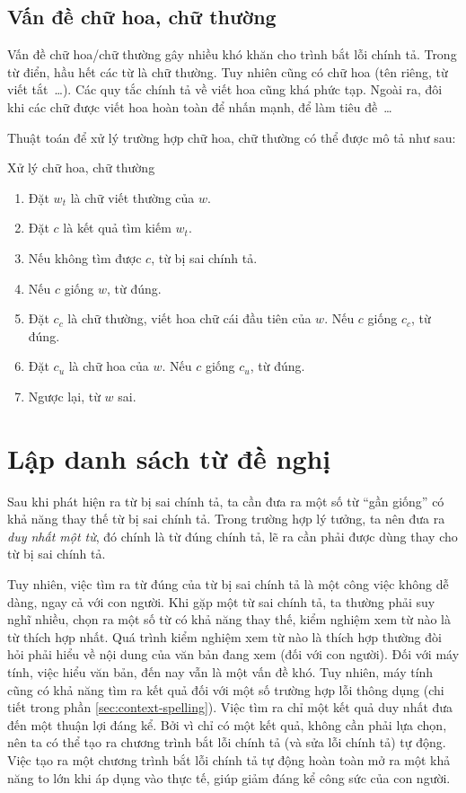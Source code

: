 \documentclass[a4paper,oneside,14pt]{extbook} %
\begin{document}
\subsection{Vấn đề chữ hoa, chữ thường}

Vấn đề chữ hoa/chữ thường gây nhiều khó khăn cho trình bắt lỗi chính
tả. Trong từ điển, hầu hết các từ là chữ thường. Tuy nhiên cũng có chữ
hoa (tên riêng, từ viết tắt~\ldots{}). Các quy tắc chính tả về viết hoa
cũng khá phức tạp. Ngoài ra, đôi khi các chữ được viết hoa hoàn toàn
để nhấn mạnh, để làm tiêu đề~\ldots{}

Thuật toán để xử lý trường hợp chữ hoa, chữ thường có thể được mô tả
như sau:
\begin{algo}\caption{Xử lý chữ hoa, chữ thường}
\begin{enumerate}
\item Đặt $w_t$ là chữ viết thường của $w$.
\item Đặt $c$ là kết quả tìm kiếm $w_t$.
\item Nếu không tìm được $c$, từ bị sai chính tả.
\item Nếu $c$ giống $w$, từ đúng.
\item Đặt $c_c$ là chữ thường, viết hoa chữ cái đầu tiên của $w$. Nếu
  $c$ giống $c_c$, từ đúng.
\item Đặt $c_u$ là chữ hoa của $w$. Nếu $c$ giống $c_u$, từ đúng.
\item Ngược lại, từ $w$ sai.
\end{enumerate}
\end{algo}



\section{Lập danh sách từ đề nghị}
\label{sec:candidate-list}

Sau khi phát hiện ra từ bị sai chính tả, ta cần đưa ra một số từ ``gần
giống'' có khả năng thay thế từ bị sai chính tả. Trong trường hợp lý
tưởng, ta nên đưa ra {\em duy nhất một từ}, đó chính là từ đúng
chính tả, lẽ ra cần phải được dùng thay cho từ bị sai chính tả.

Tuy nhiên, việc tìm ra từ đúng của từ bị sai chính tả là một công việc
không dễ dàng, ngay cả với con người. Khi gặp một từ sai chính tả, ta
thường phải suy nghĩ nhiều, chọn ra một số từ có khả năng thay thế,
kiểm nghiệm xem từ nào là từ thích hợp nhất. Quá trình kiểm nghiệm xem
từ nào là thích hợp thường đòi hỏi phải hiểu về nội dung của văn bản
đang xem (đối với con người). Đối với máy tính, việc hiểu văn bản, đến
nay vẫn là một vấn đề khó. Tuy nhiên, máy tính cũng có khả năng tìm ra
kết quả đối với một số trường hợp lỗi thông dụng (chi tiết trong phần
\ref{sec:context-spelling}). Việc tìm ra chỉ một kết quả duy nhất đưa
đến một thuận lợi đáng kể. Bởi vì chỉ có một kết quả, không cần phải lựa
chọn, nên ta có thể tạo ra chương trình bắt lỗi chính tả (và sửa lỗi
chính tả) tự động. Việc tạo ra một chương trình bắt lỗi chính tả tự
động hoàn toàn mở ra một khả năng to lớn khi áp dụng vào thực tế, giúp
giảm đáng kể công sức của con người.
\end{document}
